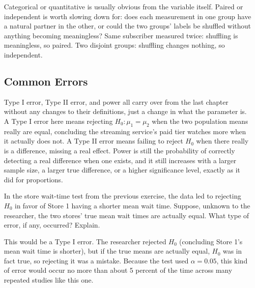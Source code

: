 Categorical or quantitative is usually obvious from the variable itself. Paired or independent is worth slowing down for: does each measurement in one group have a natural partner in the other, or could the two groups' labels be shuffled without anything becoming meaningless? Same subscriber measured twice: shuffling is meaningless, so paired. Two disjoint groups: shuffling changes nothing, so independent.

\subsection{Common Errors}

Type I error, Type II error, and power all carry over from the last chapter without any changes to their definitions, just a change in what the parameter is. A Type I error here means rejecting $H_0: \mu_1 = \mu_2$ when the two population means really are equal, concluding the streaming service's paid tier watches more when it actually does not. A Type II error means failing to reject $H_0$ when there really is a difference, missing a real effect. Power is still the probability of correctly detecting a real difference when one exists, and it still increases with a larger sample size, a larger true difference, or a higher significance level, exactly as it did for proportions.

\begin{Exercise}[title={Naming the Error}, label={ex:means-test2-error}]
In the store wait-time test from the previous exercise, the data led to rejecting $H_0$ in favor of Store 1 having a shorter mean wait time. Suppose, unknown to the researcher, the two stores' true mean wait times are actually equal. What type of error, if any, occurred? Explain.
\end{Exercise}

\begin{Answer}[ref={ex:means-test2-error}]
This would be a Type I error. The researcher rejected $H_0$ (concluding Store 1's mean wait time is shorter), but if the true means are actually equal, $H_0$ was in fact true, so rejecting it was a mistake. Because the test used $\alpha = 0.05$, this kind of error would occur no more than about 5 percent of the time across many repeated studies like this one.
\end{Answer}

